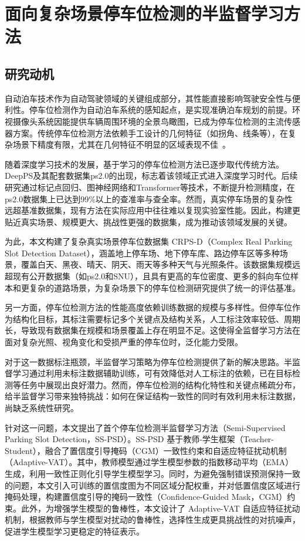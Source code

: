 \setlength{\baselineskip}{20pt}
\chapter{面向复杂场景停车位检测的半监督学习方法}
\label{cha:chap2}

\section{研究动机}
自动泊车技术作为自动驾驶领域的关键组成部分，其性能直接影响驾驶安全性与便利性。停车位检测作为自动泊车系统的感知起点，是实现准确泊车规划的前提。环视摄像头系统因能提供车辆周围环境的全景鸟瞰图，已成为停车位检测的主流传感器方案。传统停车位检测方法依赖手工设计的几何特征（如拐角、线条等），在复杂场景下精度有限，尤其在几何特征不明显的区域表现不佳~\cite{shengli2024}。

随着深度学习技术的发展，基于学习的停车位检测方法已逐步取代传统方法。DeepPS\cite{zhang2018vision}及其配套数据集ps2.0的出现，标志着该领域正式进入深度学习时代。后续研究通过标记点回归\cite{huang2019dmpr}、图神经网络\cite{min2021attentional}和Transformer\cite{bui2023transformer}等技术，不断提升检测精度，在ps2.0数据集上已达到99\%以上的查准率与查全率。然而，真实停车场景的复杂性远超基准数据集，现有方法在实际应用中往往难以复现实验室性能。因此，构建更贴近真实场景、规模更大、挑战性更强的数据集，成为推动该领域发展的关键。

为此，本文构建了复杂真实场景停车位数据集 CRPS-D\cite{zhang2025advancing}（Complex Real Parking Slot Detection Dataset），涵盖地上停车场、地下停车库、路边停车区等多种场景，覆盖白天、黑夜、晴天、阴天、雨天等多种天气与光照条件。该数据集规模远超现有公开数据集（如ps2.0\cite{zhang2018vision}和SNU\cite{do2020context}），且具有更高的车位密度、更多的斜向车位样本和更复杂的道路场景，为复杂场景下的停车位检测研究提供了统一的评估基准。

另一方面，停车位检测方法的性能高度依赖训练数据的规模与多样性。但停车位作为结构化目标，其标注需要标记多个关键点及结构关系，人工标注效率较低、周期长，导致现有数据集在规模和场景覆盖上存在明显不足。这使得全监督学习方法在面对复杂光照、视角变化和受损严重的停车位时，泛化能力受限。

对于这一数据标注瓶颈，半监督学习策略为停车位检测提供了新的解决思路。半监督学习通过利用未标注数据辅助训练，可有效降低对人工标注的依赖，已在目标检测等任务中展现出良好潜力。然而，停车位检测的结构化特性和关键点稀疏分布，给半监督学习带来独特挑战：如何在保证结构一致性的同时有效利用未标注数据，尚缺乏系统性研究。

针对这一问题，本文提出了首个停车位检测半监督学习方法（Semi-Supervised Parking Slot Detection，SS-PSD）。SS-PSD 基于教师-学生框架（Teacher-Student\cite{tarvainen2017mean}），融合了置信度引导掩码（CGM）一致性约束和自适应特征扰动机制（Adaptive-VAT）。其中，教师模型通过学生模型参数的指数移动平均（EMA\cite{tarvainen2017mean}）生成，利用一致性正则化引导学生模型学习。同时，为避免强制错误预测保持一致的问题，本文引入可训练的置信度图为不同区域分配权重，并对低置信度区域进行掩码处理，构建置信度引导的掩码一致性（Confidence-Guided Mask，CGM）约束。此外，为增强学生模型的鲁棒性，本文设计了 Adaptive-VAT 自适应特征扰动机制，根据教师与学生模型对扰动的鲁棒性，选择性生成更具挑战性的对抗噪声，促进学生模型学习更稳定的特征表示。

